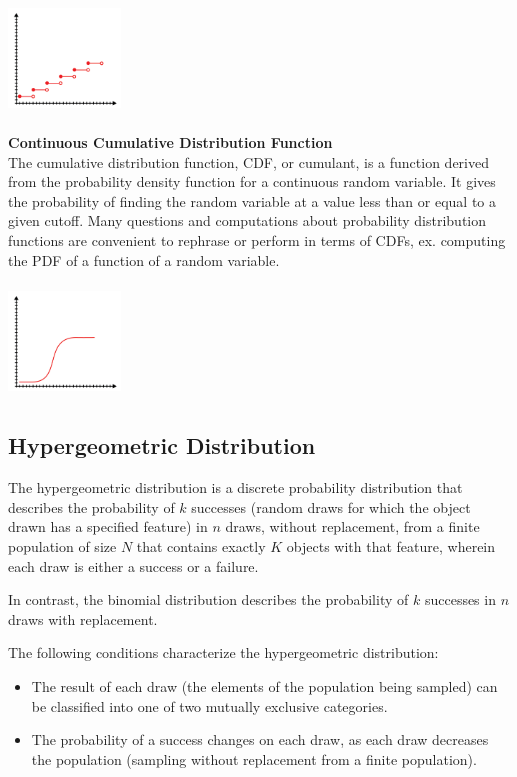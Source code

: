 \documentclass{article}
\begin{document}
\includegraphics[width=3cm, height=3cm]{discrete_cdf}

\textbf{Continuous Cumulative Distribution Function} \\
The cumulative distribution function, CDF, or cumulant, is a function derived from the probability density function for a continuous random variable. It gives the probability of finding the random variable at a value less than or equal to a given cutoff. Many questions and computations about probability distribution functions are convenient to rephrase or perform in terms of CDFs, ex. computing the PDF of a function of a random variable.

\includegraphics[width=3cm, height=3cm]{continuos_cdf}

\subsection{Hypergeometric Distribution}
The hypergeometric distribution is a discrete probability distribution that describes the probability of $k$ successes (random draws for which the object drawn has a specified feature) in $n$ draws, without replacement, from a finite population of size $N$ that contains exactly 
$K$ objects with that feature, wherein each draw is either a success or a failure. 

In contrast, the binomial distribution describes the probability of $k$ successes in $n$ draws with replacement.

The following conditions characterize the hypergeometric distribution:
\begin{itemize}
    \item The result of each draw (the elements of the population being sampled) can be classified into one of two mutually exclusive categories.
    \item The probability of a success changes on each draw, as each draw decreases the population (sampling without replacement from a finite population).
\end{itemize}
\end{document}
